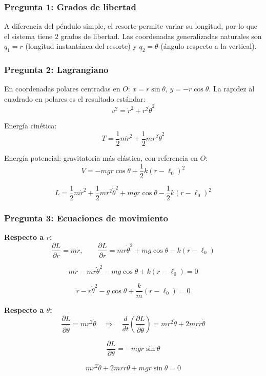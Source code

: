 \begin{sol}

\subsubsection*{Pregunta 1: Grados de libertad}

A diferencia del péndulo simple, el resorte permite variar su longitud, por lo que el sistema tiene $2$ grados de libertad. Las coordenadas generalizadas naturales son $q_1 = r$ (longitud instantánea del resorte) y $q_2 = \theta$ (ángulo respecto a la vertical).

\subsubsection*{Pregunta 2: Lagrangiano}

En coordenadas polares centradas en $O$: $x = r\sin\theta$, $y=-r\cos\theta$. La rapidez al cuadrado en polares es el resultado estándar:
$$v^2 = \dot{r}^2 + r^2\dot\theta^2$$

Energía cinética:
$$T = \frac{1}{2}m\dot{r}^2 + \frac{1}{2}mr^2\dot\theta^2$$

Energía potencial: gravitatoria más elástica, con referencia en $O$:
$$V = -mgr\cos\theta + \frac{1}{2}k(r-\ell_0)^2$$

$$\boxed{L = \frac{1}{2}m\dot{r}^2 + \frac{1}{2}mr^2\dot\theta^2 + mgr\cos\theta - \frac{1}{2}k(r-\ell_0)^2}$$

\subsubsection*{Pregunta 3: Ecuaciones de movimiento}

\textbf{Respecto a $r$:}
$$\frac{\partial L}{\partial\dot{r}} = m\dot{r}, \qquad \frac{\partial L}{\partial r} = mr\dot\theta^2 + mg\cos\theta - k(r-\ell_0)$$

$$m\ddot{r} - mr\dot\theta^2 - mg\cos\theta + k(r-\ell_0) = 0$$

$$\boxed{\ddot{r} - r\dot\theta^2 - g\cos\theta + \frac{k}{m}(r-\ell_0) = 0}$$

\textbf{Respecto a $\theta$:}
$$\frac{\partial L}{\partial\dot\theta} = mr^2\dot\theta \quad\Rightarrow\quad \frac{d}{dt}\left(\frac{\partial L}{\partial\dot\theta}\right) = mr^2\ddot\theta + 2mr\dot{r}\dot\theta$$

$$\frac{\partial L}{\partial\theta} = -mgr\sin\theta$$

$$mr^2\ddot\theta + 2mr\dot{r}\dot\theta + mgr\sin\theta = 0$$


\end{sol}
